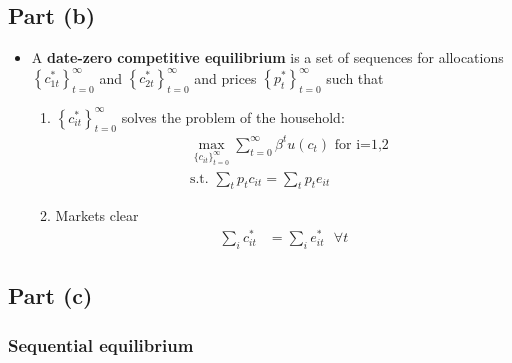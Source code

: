 \documentclass{scrartcl}
\begin{document}
\subsection*{Part (b)}

\begin{itemize}
	\item A \textbf{date-zero competitive equilibrium} is a set of sequences for allocations $\left\{c_{1t}^*\right\}_{t=0}^{\infty}$ and $\left\{c_{2t}^*\right\}_{t=0}^{\infty}$ and prices $\left\{p_{t}^*\right\}_{t=0}^{\infty}$ such that 
	
	\begin{enumerate}
		\item $\left\{c_{it}^*\right\}_{t=0}^{\infty}$ solves the problem of the household:
		\begin{align}
		&\max_{\{{c_{it}}\}_{t=0}^{\infty}} {\sum_{t=0}^{\infty} \beta^t u(c_t)} \text{ for i=1,2}\\
		&\text{s.t. } \sum_t p_{t} c_{it}=\sum_t p_{t} e_{it} \nonumber 
		\end{align}
		\item Markets clear
		\begin{align}
		\sum_{i} c_{it}^*&=\sum_{i} e_{it}^* \text{ } \forall t
		\end{align}
	\end{enumerate}

\end{itemize}

\subsection*{Part (c)}

\subsubsection*{Sequential equilibrium}
\end{document}
